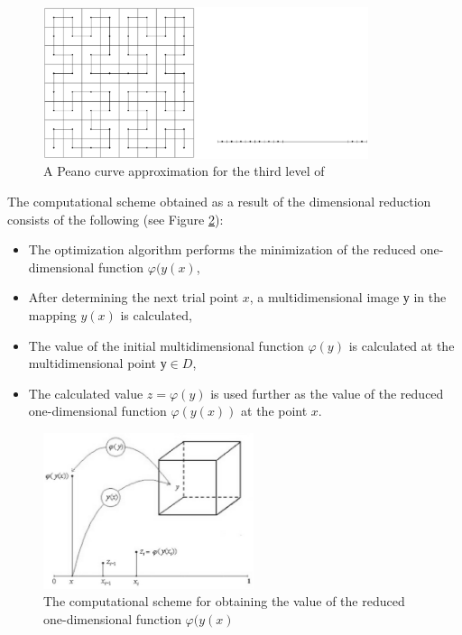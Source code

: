 \documentclass{gOMS2e}
\theoremstyle{plain}%
\theoremstyle{definition}
\theoremstyle{remark}
\begin{document}
\begin{figure}[h!]
    \centering
		\includegraphics[width=0.85\textwidth]{pictures/peanoC.eps}
		\caption{A Peano curve approximation for the third level of}
    \label{fig:peanoC}
\end{figure}

\par
The computational scheme obtained as a result of the dimensional reduction consists of the following (see Figure \ref{fig:peanoCUsage}):
\begin{itemize}
  \item The optimization algorithm performs the minimization of the reduced one-dimensional function \(\varphi(y(x)\),
  \item After determining the next trial point \(x\), a multidimensional image \(у\) in the mapping \(y(x)\) is calculated,
  \item The value of the initial multidimensional function \(\varphi(y)\) is calculated at the multidimensional point \(у\in D\),
  \item The calculated value \(z=\varphi(y)\) is used further as the value of the reduced one-dimensional function \(\varphi(y(x))\) at the point \(x\).
\end{itemize}

\begin{figure}[h!]
    \centering
		\includegraphics[width=0.55\textwidth]{pictures/peanoCUsage.eps}
		\caption{The computational scheme for obtaining the value of the reduced one-dimensional function \(\varphi(y(x)\)}
    \label{fig:peanoCUsage}
\end{figure}
\end{document}

